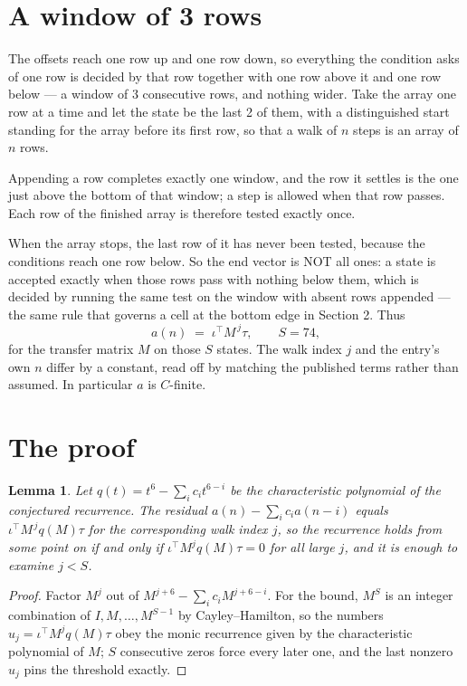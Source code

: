 \documentclass[11pt,a4paper]{article}
\theoremstyle{plain}
\newtheorem{lemma}[theorem]{Lemma}
\theoremstyle{definition}
\begin{document}
\section{A window of 3 rows}

The offsets reach one row up and one row down, so everything the condition asks of one row is
decided by that row together with one row above it and one row below --- a window of
$3$ consecutive rows, and nothing wider. Take the array one row at a time and
let the state be the last 2 of them, with a distinguished start standing for the array before its
first row, so that a walk of $n$ steps is an array of $n$ rows.

Appending a row completes exactly one window, and the row it settles is the one just above the bottom of that window; a step is
allowed when that row passes. Each row of the finished array is therefore tested exactly once.

When the array stops, the last row of it has never been tested, because the
conditions reach one row below. So the end vector is NOT all ones: a state is accepted exactly when
those rows pass with nothing below them, which is decided by running the same test on the window
with absent rows appended --- the same rule that governs a cell at the bottom edge in
Section 2.
Thus
\[
a(n)\;=\;\iota^{\!\top}M^{\,j}\tau ,\qquad S=74,
\]
for the transfer matrix $M$ on those $S$ states. The walk index $j$ and the entry's own $n$
differ by a constant, read off by matching the published terms rather than assumed. In
particular $a$ is $C$-finite.

\section{The proof}

\begin{lemma}\label{lem:crit}
Let $q(t)=t^{6}-\sum_i c_it^{6-i}$ be the characteristic polynomial of the
conjectured recurrence. The residual $a(n)-\sum_ic_ia(n-i)$ equals
$\iota^{\!\top}M^{\,j}q(M)\tau$ for the corresponding walk index $j$, so the recurrence
holds from some point on if and only if $\iota^{\!\top}M^{j}q(M)\tau=0$ for all large $j$,
and it is enough to examine $j<S$.
\end{lemma}

\begin{proof}
Factor $M^{j}$ out of $M^{j+6}-\sum_ic_iM^{j+6-i}$. For the bound, $M^{S}$
is an integer combination of $I,M,\dots,M^{S-1}$ by Cayley--Hamilton, so the numbers
$u_j=\iota^{\!\top}M^{j}q(M)\tau$ obey the monic recurrence given by the characteristic
polynomial of $M$; $S$ consecutive zeros force every later one, and the last nonzero $u_j$
pins the threshold exactly.
\end{proof}
\end{document}
